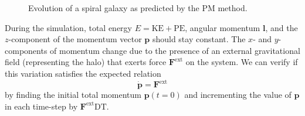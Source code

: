 \begin{figure}[!ht]
    \caption{Evolution of a spiral galaxy as predicted by the PM method.}
    \label{fig:spiral-galaxy-evolution-pm}
\end{figure}

During the simulation, total energy $E = \textrm{KE} + \textrm{PE}$, angular momentum $\mathbf{l}$, and the $z$-component of the momentum vector $\mathbf{p}$ should stay constant.
The $x$- and $y$-components of momentum change due to the presence of an external gravitational field (representing the halo) that exerts force $\mathbf{F}^\text{ext}$ on the system.
We can verify if this variation satisfies the expected relation
\begin{equation}\label{eq:expected-momentum-change}
    \dot{\mathbf{p}} = \mathbf{F}^\text{ext}
\end{equation}
by finding the initial total momentum $\mathbf{p}(t = 0)$ and incrementing the value of $\mathbf{p}$ in each time-step by $\mathbf{F}^\text{ext}\textrm{DT}$.

